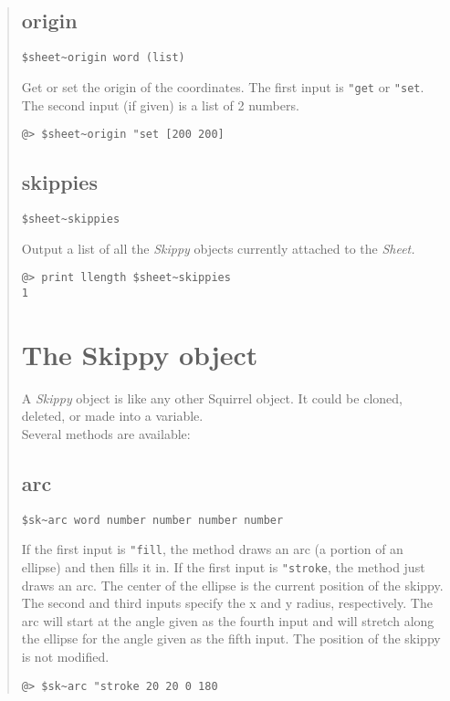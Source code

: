 \documentclass[twoside,10pt,openany]{report}
\newcommand{\squirrel}{{\sc Squirrel} }
\newcounter{ex}[chapter]
\newcounter{sc}[chapter]
\begin{document}
\begin{quote}
\cbstart
\subsection*{origin} 
\begin{verbatim}
$sheet~origin word (list)
\end{verbatim}
Get or set the origin of the coordinates. The first input is {\tt "get} or {\tt "set}. The second input (if given) is a list of 2 numbers.
\begin{verbatim}
@> $sheet~origin "set [200 200]
\end{verbatim}
\cbend

\subsection*{skippies} 
\begin{verbatim}
$sheet~skippies
\end{verbatim}
Output a list of all the {\it Skippy} objects currently attached to the {\it Sheet.}
\begin{verbatim}
@> print llength $sheet~skippies
1
\end{verbatim}
 
\section{The Skippy object} 

A {\it Skippy} object is like any other \squirrel object. It could be cloned, deleted, or made into a variable.\\

Several methods are available:

\subsection*{arc} 
\begin{verbatim}
$sk~arc word number number number number
\end{verbatim}
If the first input is {\tt "fill}, the method draws an arc (a portion of an ellipse) and then fills it in. If the first input is {\tt "stroke}, the method just draws an arc. The center of the ellipse is the current position of the skippy.  The second and third inputs specify the x and y radius, respectively. The arc will start at the angle given as the fourth input and will stretch along the ellipse for the angle given as the fifth input. The position of the skippy is not modified.
\begin{verbatim}
@> $sk~arc "stroke 20 20 0 180
\end{verbatim}


\end{quote}
\end{document}

